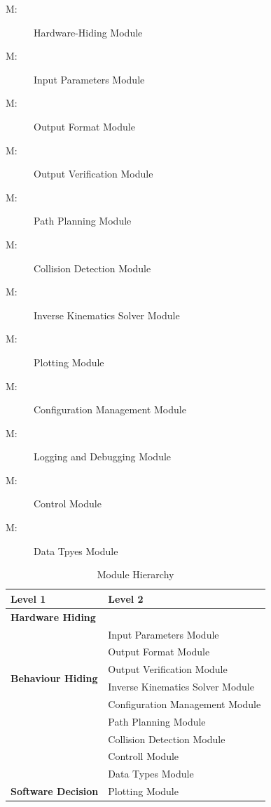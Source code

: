 \documentclass[12pt, titlepage]{article}
\newcounter{mnum}
\newcommand{\mthemnum}{M\themnum}
\begin{document}
\begin{description}
\item [ \mthemnum \label{mHH1}:] Hardware-Hiding Module
\item [ \mthemnum \label{mHH2}:] Input Parameters Module
\item [ \mthemnum \label{mHH3}:] Output Format Module
\item [ \mthemnum \label{mHH4}:] Output Verification Module
\item [ \mthemnum \label{mHH5}:] Path Planning Module
\item [ \mthemnum \label{mHH6}:] Collision Detection Module
\item [ \mthemnum \label{mHH7}:] Inverse Kinematics Solver Module
\item [ \mthemnum \label{mHH8}:] Plotting Module
\item [ \mthemnum \label{mHH9}:] Configuration Management Module
\item [ \mthemnum \label{mHH10}:] Logging and Debugging Module
\item [ \mthemnum \label{mHH11}:] Control Module
\item [ \mthemnum \label{mHH12}:] Data Tpyes Module
\end{description}


\begin{table}[h!]
  \centering
  \begin{tabular}{p{} p{}}
  \toprule
  \textbf{Level 1} & \textbf{Level 2}\\
  \midrule
  \textbf{Hardware Hiding} & \\ 
  \midrule
  \multirow{6}{0.3\textwidth}{\textbf{Behaviour Hiding}} 
  & Input Parameters Module \\ 
  & Output Format Module \\ 
  & Output Verification Module \\ 
  & Inverse Kinematics Solver Module \\ 
  & Configuration Management Module \\ 
  & Path Planning Module \\ 
  & Collision Detection Module \\ 
  & Controll Module\\
  & Data Types Module\\
  \midrule
  \multirow{1}{0.3\textwidth}{\textbf{Software Decision}} 
  & Plotting Module \\ 
  \bottomrule
  \end{tabular}
  \caption{Module Hierarchy}
  \label{TblMH}
\end{table}
  
\end{document}
